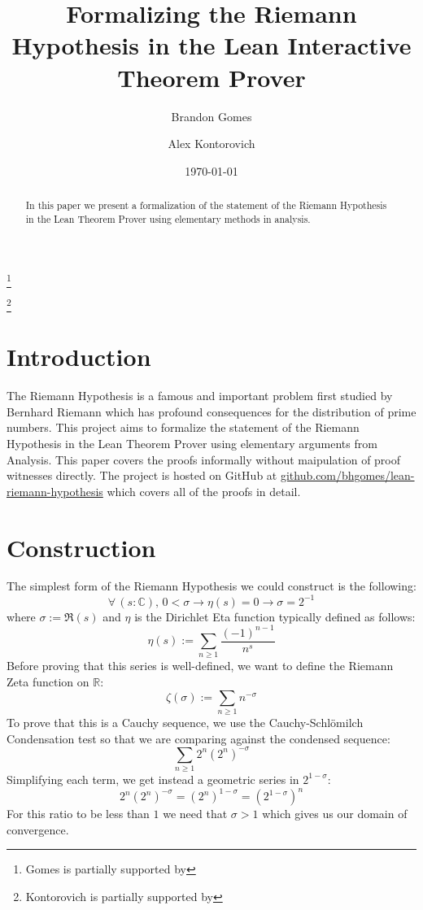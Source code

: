 \documentclass[12pt,reqno]{amsart}
\numberwithin{equation}{section}
\begin{document}
\author{Brandon Gomes}
\thanks{Gomes is partially supported by}
\address{Rutgers University, New Brunswick, NJ}

\author{Alex Kontorovich}
\thanks{Kontorovich is partially supported by}
\address{Rutgers University, New Brunswick, NJ}

\title[Formalizing the Riemann Hypothesis]{Formalizing the Riemann Hypothesis in the Lean Interactive Theorem Prover}

\begin{abstract}
In this paper we present a formalization of the statement of the Riemann Hypothesis in the Lean Theorem Prover using elementary methods in analysis.
\end{abstract}

\date{\today}
\maketitle
\tableofcontents

\section{Introduction}

The Riemann Hypothesis is a famous and important problem first studied by Bernhard Riemann which has profound consequences for the distribution of prime numbers. This project aims to formalize the statement of the Riemann Hypothesis in the Lean Theorem Prover using elementary arguments from Analysis. This paper covers the proofs informally without maipulation of proof witnesses directly. The project is hosted on GitHub at \href{https://github.com/bhgomes/lean-riemann-hypothesis}{github.com/bhgomes/lean-riemann-hypothesis} which covers all of the proofs in detail.

\section{Construction}

The simplest form of the Riemann Hypothesis we could construct is the following:
\[
    \forall\,(s : \mathbb{C}),\, 0 < \sigma \to \eta (s) = 0 \to \sigma = 2^{-1}
\]
where $\sigma := \Re(s)$ and $\eta$ is the Dirichlet Eta function typically defined as follows:
\[
    \eta(s) := \sum_{n\geq 1}\frac{(-1)^{n-1}}{n^s}
\]
Before proving that this series is well-defined, we want to define the Riemann Zeta function on $\mathbb{R}$:
\[
    \zeta(\sigma) := \sum_{n\geq 1}n^{-\sigma}
\]
To prove that this is a Cauchy sequence, we use the Cauchy-Schl\"omilch Condensation test so that we are comparing against the condensed sequence:
\[
    \sum_{n\geq 1}2^n(2^n)^{-\sigma}
\]
Simplifying each term, we get instead a geometric series in $2^{1-\sigma}$:
\[
    2^n(2^n)^{-\sigma} = (2 ^ n)^{1 - \sigma} = (2 ^ {1 - \sigma}) ^ n
\]
For this ratio to be less than $1$ we need that $\sigma > 1$ which gives us our domain of convergence.
\end{document}
